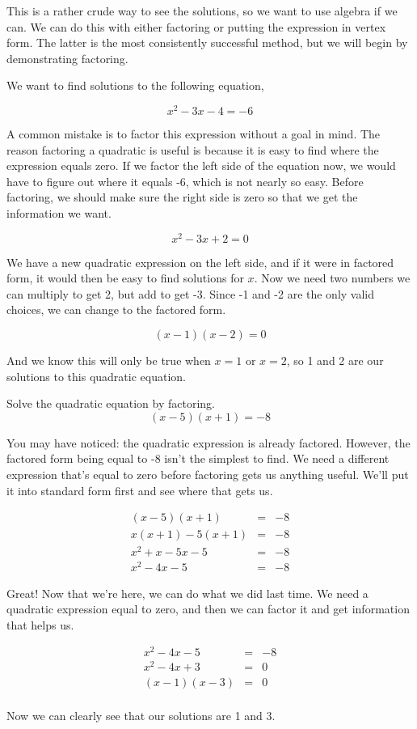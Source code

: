This is a rather crude way to see the solutions, so we want to use algebra if we can.  We can do this with either factoring or putting the expression in vertex form.  The latter is the most consistently successful method, but we will begin by demonstrating factoring.

We want to find solutions to the following equation,

$$x^2 - 3x - 4 = - 6$$

A common mistake is to factor this expression without a goal in mind.  The reason factoring a quadratic is useful is because it is easy to find where the expression equals zero.  If we factor the left side of the equation now, we would have to figure out where it equals -6, which is not nearly so easy.  Before factoring, we should make sure the right side is zero so that we get the information we want.

$$x^2 - 3x + 2 = 0$$

We have a new quadratic expression on the left side, and if it were in factored form, it would then be easy to find solutions for $x$.  Now we need two numbers we can multiply to get 2, but add to get -3.  Since -1 and -2 are the only valid choices, we can change to the factored form.

$$(x-1)(x-2) = 0$$

And we know this will only be true when $x = 1$ or $x = 2$, so 1 and 2 are our solutions to this quadratic equation.

\begin{example}
Solve the quadratic equation by factoring.
$$(x - 5)(x + 1) = -8$$

You may have noticed: the quadratic expression is already factored.  However, the factored form being equal to -8 isn't the simplest to find.  We need a different expression that's equal to zero before factoring gets us anything useful.  We'll put it into standard form first and see where that gets us.

$$\begin{array}{rcl}
(x - 5)(x + 1) & = & -8 \\
x(x+1) - 5(x+1) & = & -8 \\
x^2 + x - 5x - 5 & = & -8 \\
x^2 - 4x - 5 & = & -8
\end{array}$$

Great!  Now that we're here, we can do what we did last time.  We need a quadratic expression equal to zero, and then we can factor it and get information that helps us.

$$\begin{array}{rcl}
x^2 - 4x - 5 & = & -8 \\
x^2 - 4x + 3 & = & 0 \\
(x - 1)(x - 3) & = & 0 \\
\end{array}$$

Now we can clearly see that our solutions are 1 and 3.

\end{example}


